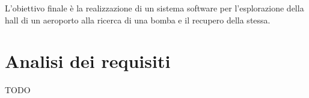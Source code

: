 \documentclass{llncs}
\newcommand{\labelsec}[1]{\label{sec:#1}}
\newcommand{\labelssec}[1]{\label{ssec:#1}}
\begin{document}
L'obiettivo finale è la realizzazione di un sistema software per l'esplorazione della hall di un aeroporto alla ricerca di una bomba e il recupero della stessa.





\section{Analisi dei requisiti}\labelsec{req_analysis}
TODO %


\end{document}

